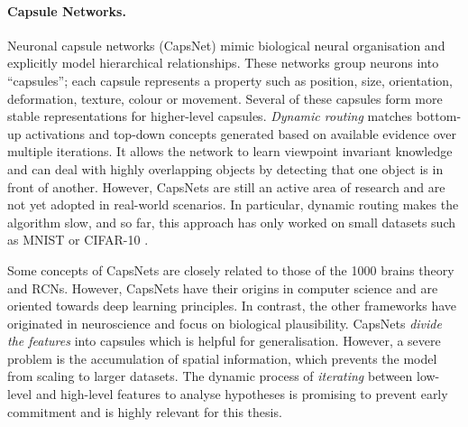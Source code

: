 \paragraph{Capsule Networks.} Neuronal capsule networks (CapsNet)  mimic biological neural organisation and explicitly model hierarchical relationships. These networks group neurons into ``capsules''; each capsule represents a property such as position, size, orientation, deformation, texture, colour or movement. Several of these capsules form more stable representations for higher-level capsules. \emph{Dynamic routing}  matches bottom-up activations and top-down concepts generated based on available evidence over multiple iterations. It allows the network to learn viewpoint invariant knowledge and can deal with highly overlapping objects by detecting that one object is in front of another. However, CapsNets are still an active area of research and are not yet adopted in real-world scenarios. In particular, dynamic routing makes the algorithm slow, and so far, this approach has only worked on small datasets such as MNIST  or CIFAR-10 .

Some concepts of CapsNets are closely related to those of the 1000 brains theory and RCNs. However, CapsNets have their origins in computer science and are oriented towards deep learning principles. In contrast, the other frameworks have originated in neuroscience and focus on biological plausibility. CapsNets \emph{divide the features} into capsules which is helpful for generalisation. However, a severe problem is the accumulation of spatial information, which prevents the model from scaling to larger datasets.
The dynamic process of \emph{iterating} between low-level and high-level features to analyse hypotheses is promising to prevent early commitment  and is highly relevant for this thesis.


